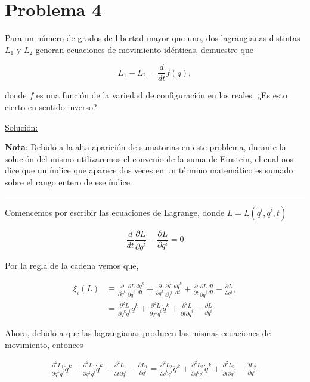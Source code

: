 \documentclass[a4paper,10pt]{article}
\numberwithin{equation}{section}
\begin{document}
\section{Problema 4}

Para un número de grados de libertad mayor que uno, dos lagrangianas distintas $L_1$
y $L_2$ generan ecuaciones de movimiento idénticas, demuestre que 

$$
L_1 - L_2 = \frac{d}{dt}f(q),
$$

donde $f$ es una función de la variedad de configuración en los reales. ¿Es esto cierto 
en sentido inverso?

\vspace{.3cm}

\underline{Solución:} \vspace{.3cm}

\textbf{Nota}: Debido a la alta aparición de sumatorias en este problema, durante la
solución del mismo utilizaremos el convenio de la suma de Einstein, el cual nos dice 
que un índice que aparece dos veces en un término matemático es sumado sobre 
el rango entero de ese índice.

\noindent\rule[0.5ex]{\linewidth}{1pt}

Comencemos por escribir las ecuaciones de Lagrange, donde $L = L(q^i,\dot{q}^i,t)$

\begin{equation}
 \frac{d}{dt}\frac{\partial L}{\partial \dot{q}^i} - \frac{\partial L}{\partial q^i} = 0 
\end{equation}

Por la regla de la cadena vemos que, 

\begin{align*}
 \xi_i (L) &\equiv \frac{\partial}{\partial \dot{q}^k}\frac{\partial L}{\partial \dot{q}^i} 
 \frac{d\dot{q}^k}{dt} + \frac{\partial}{\partial q^k}\frac{\partial L}{\partial \dot{q}^i} 
 \frac{dq^k}{dt} + \frac{\partial}{\partial t}\frac{\partial L}{\partial \dot{q}^i} \frac{dt}{dt}
 - \frac{\partial L}{\partial q^i}, \\
 &= \frac{\partial^2 L}{\partial \dot{q}^k\dot{q}^i} \ddot{q}^k + 
 \frac{\partial^2 L}{\partial q^k \dot{q}^i} \dot{q}^k+ \frac{\partial^2 L}{\partial t \partial \dot{q}^i}
 - \frac{\partial L}{\partial q^i}
 \end{align*}

Ahora, debido a que las lagrangianas producen las mismas ecuaciones de movimiento,
entonces 

\begin{align}
 \frac{\partial^2 L_1}{\partial \dot{q}^k\dot{q}^i} \ddot{q}^k + 
 \frac{\partial^2 L_1}{\partial q^k \dot{q}^i} \dot{q}^k+ \frac{\partial^2 L_1}{\partial t \partial \dot{q}^i}
 - \frac{\partial L_1}{\partial q^i} = \frac{\partial^2 L_2}{\partial \dot{q}^k\dot{q}^i} \ddot{q}^k + 
 \frac{\partial^2 L_2}{\partial q^k \dot{q}^i} \dot{q}^k+ \frac{\partial^2 L_2}{\partial t \partial \dot{q}^i}
 - \frac{\partial L_2}{\partial q^i}.
\end{align}
\end{document}
